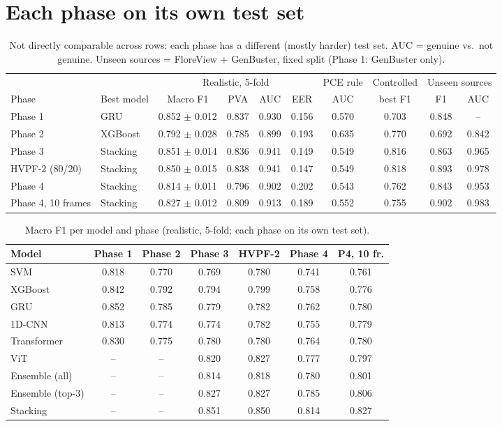 \documentclass[11pt,a4paper]{article}
\begin{document}
\section{Each phase on its own test set}
\begin{table}[H]\centering\small\setlength{\tabcolsep}{4pt}\begin{tabular}{llcccccccc}\toprule & & \multicolumn{4}{c}{Realistic, 5-fold} & PCE rule & Controlled & \multicolumn{2}{c}{Unseen sources} \\\cmidrule(lr){3-6}\cmidrule(lr){9-10} Phase & Best model & Macro F1 & PVA & AUC & EER & AUC & best F1 & F1 & AUC \\\midrule
Phase 1 & GRU & 0.852 $\pm$ 0.012 & 0.837 & 0.930 & 0.156 & 0.570 & 0.703 & 0.848 & -- \\
Phase 2 & XGBoost & 0.792 $\pm$ 0.028 & 0.785 & 0.899 & 0.193 & 0.635 & 0.770 & 0.692 & 0.842 \\
Phase 3 & Stacking & 0.851 $\pm$ 0.014 & 0.836 & 0.941 & 0.149 & 0.549 & 0.816 & 0.863 & 0.965 \\
HVPF-2 (80/20) & Stacking & 0.850 $\pm$ 0.015 & 0.838 & 0.941 & 0.147 & 0.549 & 0.818 & 0.893 & 0.978 \\
Phase 4 & Stacking & 0.814 $\pm$ 0.011 & 0.796 & 0.902 & 0.202 & 0.543 & 0.762 & 0.843 & 0.953 \\
Phase 4, 10 frames & Stacking & 0.827 $\pm$ 0.012 & 0.809 & 0.913 & 0.189 & 0.552 & 0.755 & 0.902 & 0.983 \\
\bottomrule\end{tabular}\caption{Not directly comparable across rows: each phase has a different (mostly harder) test set. AUC = genuine vs.\ not genuine. Unseen sources = FloreView + GenBuster, fixed split (Phase 1: GenBuster only).}\end{table}
\begin{table}[H]\centering\small\setlength{\tabcolsep}{4pt}\begin{tabular}{lcccccc}\toprule Model & Phase 1 & Phase 2 & Phase 3 & HVPF-2 & Phase 4 & P4, 10 fr. \\\midrule
SVM & 0.818 & 0.770 & 0.769 & 0.780 & 0.741 & 0.761 \\
XGBoost & 0.842 & 0.792 & 0.794 & 0.799 & 0.758 & 0.776 \\
GRU & 0.852 & 0.785 & 0.779 & 0.782 & 0.762 & 0.780 \\
1D-CNN & 0.813 & 0.774 & 0.774 & 0.782 & 0.755 & 0.779 \\
Transformer & 0.830 & 0.775 & 0.780 & 0.780 & 0.764 & 0.780 \\
ViT & -- & -- & 0.820 & 0.827 & 0.777 & 0.797 \\
Ensemble (all) & -- & -- & 0.814 & 0.818 & 0.780 & 0.801 \\
Ensemble (top-3) & -- & -- & 0.827 & 0.827 & 0.785 & 0.806 \\
Stacking & -- & -- & 0.851 & 0.850 & 0.814 & 0.827 \\
\bottomrule\end{tabular}\caption{Macro F1 per model and phase (realistic, 5-fold; each phase on its own test set).}\end{table}
\end{document}
